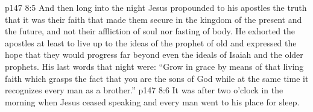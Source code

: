 \pc \vs p147 8:5 And then long into the night Jesus propounded to his apostles the truth that it was their faith that made them secure in the kingdom of the present and the future, and not their affliction of soul nor fasting of body. He exhorted the apostles at least to live up to the ideas of the prophet of old and expressed the hope that they would progress far beyond even the ideals of Isaiah and the older prophets. His last words that night were: \textcolor{ubdarkred}{“Grow in grace by means of that living faith which grasps the fact that you are the sons of God while at the same time it recognizes every man as a brother.”}
\vs p147 8:6 It was after two o’clock in the morning when Jesus ceased speaking and every man went to his place for sleep.
